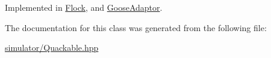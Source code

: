 Implemented in \hyperlink{classFlock_a3bbac4b6672dd5b30c5edeba5e70fe72}{Flock}, and \hyperlink{classGooseAdaptor_ae7b77a04d41102f386baf4f7ce7943f2}{Goose\-Adaptor}.



The documentation for this class was generated from the following file\-:\begin{DoxyCompactItemize}
\item 
\hyperlink{simulator_2Quackable_8hpp}{simulator/\-Quackable.\-hpp}\end{DoxyCompactItemize}

